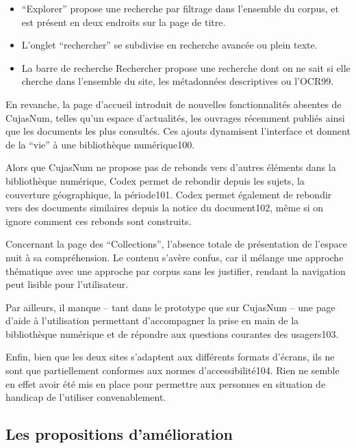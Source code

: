 \begin{itemize}
	\item \enquote{Explorer} propose une recherche par filtrage dans l’ensemble du corpus, et est présent en deux endroits sur la page de titre. 

\item L’onglet \enquote{rechercher} se subdivise en recherche avancée ou plein texte. 

\item La barre de recherche Rechercher propose une recherche dont on ne sait si elle cherche dans l’ensemble du site, les métadonnées descriptives ou l’OCR99.  

\end{itemize}
En revanche, la page d’accueil introduit de nouvelles fonctionnalités absentes de CujasNum, telles qu’un espace d’actualités, les ouvrages récemment publiés ainsi que les documents les plus consultés. Ces ajouts dynamisent l’interface et donnent de la \enquote{vie} à une bibliothèque numérique100.  

Alors que CujasNum ne propose pas de rebonds vers d’autres éléments dans la bibliothèque numérique, Codex permet de rebondir depuis les sujets, la couverture géographique, la période101. Codex permet également de rebondir vers des documents similaires depuis la notice du document102, même si on ignore comment ces rebonds sont construits. 

Concernant la page des \enquote{Collections}, l’absence totale de présentation de l’espace nuit à sa compréhension. Le contenu s’avère confus, car il mélange une approche thématique avec une approche par corpus sans les justifier, rendant la navigation peut lisible pour l’utilisateur.  

Par ailleurs, il manque – tant dans le prototype que sur CujasNum – une page d’aide à l’utilisation permettant d’accompagner la prise en main de la bibliothèque numérique et de répondre aux questions courantes des usagers103. 

Enfin, bien que les deux sites s’adaptent aux différents formats d’écrans, ils ne sont que partiellement conformes aux normes d’accessibilité104. Rien ne semble en effet avoir été mis en place pour permettre aux personnes en situation de handicap de l’utiliser convenablement.  

\subsection{Les propositions d’amélioration}

